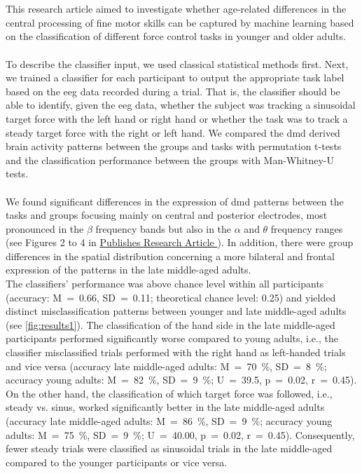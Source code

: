 \\
\\
This research article aimed to investigate whether age-related differences in the central processing of fine motor skills can be captured by machine learning based on the classification of different force control tasks in younger and older adults.\\
\\
To describe the classifier input, we used classical statistical methods first. Next, we trained a classifier for each participant to output the appropriate task label based on the \gls{eeg} data recorded during a trial. That is, the classifier should be able to identify, given the \gls{eeg} data, whether the subject was tracking a sinusoidal target force with the left hand or right hand or whether the task was to track a steady target force with the right or left hand. We compared the \gls{dmd} derived brain activity patterns between the groups and tasks with permutation t-tests and the classification performance between the groups with Man-Whitney-U tests.\\
\\
We found significant differences in the expression of \gls{dmd} patterns between the tasks and groups focusing mainly on central and posterior electrodes, most pronounced in the $\beta$ frequency bands but also in the $\alpha$ and $\theta$ frequency ranges (see Figures 2 to 4 in \hyperref[pub:paperI]{Publishes Research Article }). In addition, there were group differences in the spatial distribution concerning a more bilateral and frontal expression of the patterns in the late middle-aged adults.\\
The classifiers' performance was above chance level within all participants (accuracy: M~=~0.66, SD~=~0.11; theoretical chance level: 0.25) and yielded distinct misclassification patterns between younger and late middle-aged adults (see \autoref{fig:results1}). The classification of the hand side in the late middle-aged participants performed significantly worse compared to young adults, i.e., the classifier misclassified trials performed with the right hand as left-handed trials and vice versa (accuracy late middle-aged adults: M~=~70~\%, SD~=~8~\%; accuracy young adults: M~=~82~\%, SD~=~9~\%; U~=~39.5, p~=~0.02, r~=~0.45). On the other hand, the classification of which target force was followed, i.e., steady vs. sinus, worked significantly better in the late middle-aged adults (accuracy late middle-aged adults: M~=~86~\%, SD~=~9~\%; accuracy young adults: M~=~75~\%, SD~=~9~\%; U~=~40.00, p~=~0.02, r~=~0.45). Consequently, fewer steady trials were classified as sinusoidal trials in the late middle-aged compared to the younger participants or vice versa.

